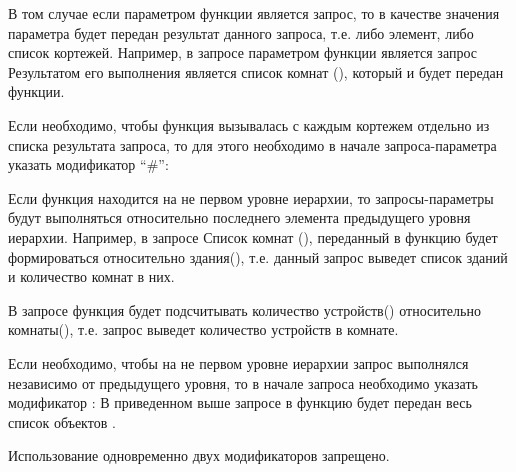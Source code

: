 В том случае если параметром функции является запрос, то в качестве значения
параметра будет передан результат данного запроса, т.е. либо элемент, либо
список кортежей. Например, в запросе
параметром функции  является запрос 
Результатом его выполнения является список комнат (), который и будет
передан функции.

Если необходимо, чтобы функция вызывалась с каждым кортежем отдельно из списка
результата запроса, то для этого необходимо в начале запроса-параметра
указать модификатор ``\#'':


Если функция находится на не первом уровне иерархии, то запросы-параметры
будут выполняться относительно последнего элемента предыдущего уровня иерархии.
Например, в запросе 
Список комнат (), переданный в функцию  будет формироваться относительно
здания(), т.е. данный запрос выведет список зданий и количество комнат в них.

В запросе
функция  будет подсчитывать количество устройств() относительно комнаты(), т.е.
запрос выведет количество устройств в комнате. 

Если необходимо, чтобы на не первом уровне иерархии запрос выполнялся независимо от предыдущего уровня,
то в начале запроса необходимо указать модификатор \cl{\%}:
В приведенном выше запросе в функцию  будет передан весь список объектов
.


Использование одновременно двух модификаторов запрещено.







